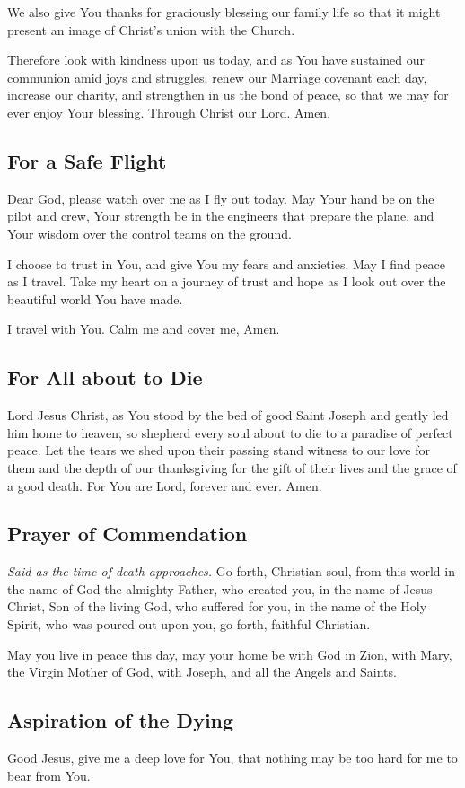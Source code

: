 \documentclass[12pt]{article}
\newcommand{\prayertitle}[1]{\subsection{#1}}
\newcommand{\note}[1]{{\small{\textsl{#1}}}\newline}
\begin{document}
We also give You thanks for graciously blessing our family life so that it might present an image of Christ's union with the Church.

Therefore look with kindness upon us today, and as You have sustained our communion amid joys and struggles, renew our Marriage covenant each day, increase our charity, and strengthen in us the bond of peace, so that we may for ever enjoy Your blessing.
Through Christ our Lord. Amen.

\prayertitle{For a Safe Flight}
Dear God, please watch over me as I fly out today.
May Your hand be on the pilot and crew, Your strength be in the engineers that prepare the plane, and Your wisdom over the control teams on the ground.

I choose to trust in You, and give You my fears and anxieties.
May I find peace as I travel.
Take my heart on a journey of trust and hope as I look out over the beautiful world You have made.

I travel with You.
Calm me and cover me,
Amen.

\prayertitle{For All about to Die}
Lord Jesus Christ, as You stood by the bed of good Saint Joseph and gently led him home to heaven, so shepherd every soul about to die to a paradise of perfect peace.
Let the tears we shed upon their passing stand witness to our love for them and the depth of our thanksgiving for the gift of their lives and the grace of a good death.
For You are Lord, forever and ever.
Amen.

\prayertitle{Prayer of Commendation}
\note{Said as the time of death approaches.}
Go forth, Christian soul, from this world in the name of God the almighty Father, who created you, in the name of Jesus Christ, Son of the living God, who suffered for you, in the name of the Holy Spirit, who was poured out upon you, go forth, faithful Christian.

May you live in peace this day, may your home be with God in Zion, with Mary, the Virgin Mother of God, with Joseph, and all the Angels and Saints.

\prayertitle{Aspiration of the Dying}
Good Jesus, give me a deep love for You, that nothing may be too hard for me to bear from You.
\end{document}
